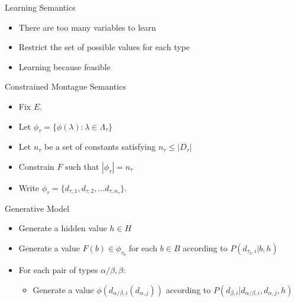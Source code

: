 \documentclass{beamer}
\newlength{\wideitemsep}
\let\olditem\item
\renewcommand{\item}{\setlength{\itemsep}{\wideitemsep}\olditem}
\begin{document}
\begin{frame}{Learning Semantics}
  \begin{itemize}
  \item There are too many variables to learn
  \item Restrict the set of possible values for each type
  \item Learning because feasible
  \end{itemize}
\end{frame}

\begin{frame}{Constrained Montague Semantics}
\begin{itemize}
\item Fix $E$.
\item Let $\phi_\tau = \{\phi(\lambda) : \lambda\in \Lambda_\tau\}$
\item Let $n_\tau$ be a set of constants satisfying $n_\tau \le |D_\tau|$
\item Constrain $F$ such that $|\phi_\tau| = n_\tau$
\item Write $\phi_\tau = \{d_{\tau,1}, d_{\tau,2}, \ldots d_{\tau,
    n_\tau}\}$.
\end{itemize}
\end{frame}

\begin{frame}{Generative Model}
\begin{itemize}
\item Generate a hidden value $h\in H$
\item Generate a value $F(b) \in \phi_{\tau_b}$ for each $b\in B$ according to
  $P(d_{\tau_b,i}|b, h)$
\item For each pair of types $\alpha/\beta, \beta$:
\begin{itemize}
\item Generate a value $\phi(d_{\alpha/\beta,i}(d_{\alpha,j}))$
  according to $P(d_{\beta,i}|d_{\alpha/\beta,i}, d_{\alpha,j},h)$
\end{itemize}
\end{itemize}
\end{frame}


\end{document}
